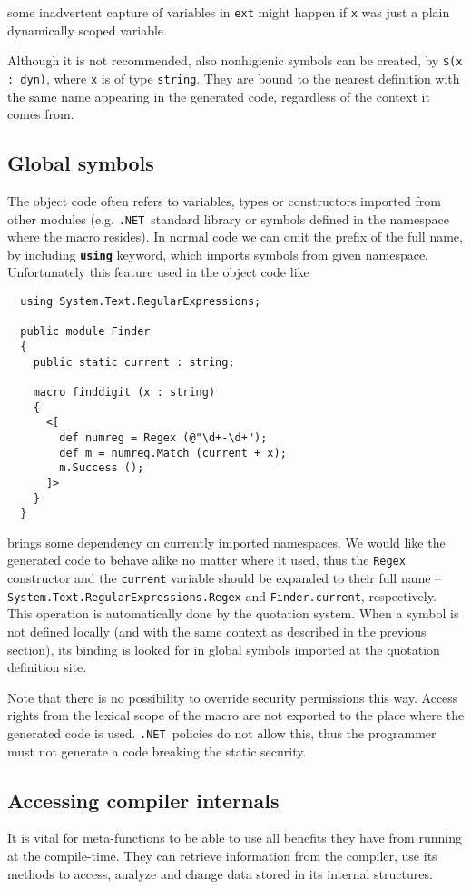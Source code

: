 \documentclass{llncs}
\newcommand{\net}[0]{{\tt .NET}}
\newcommand{\kw}[1]{{\tt \bf #1}}
\begin{document}
\noindent
some inadvertent capture of variables in \verb,ext, might happen if 
\verb,x, was just a plain dynamically scoped variable.

Although it is not recommended, also nonhigienic symbols can be created, by
\verb,$(x : dyn),, where \verb,x, is of type \verb,string,. %
They are bound to the nearest definition with the same name appearing in the
generated code, regardless of the context it comes from.

\subsection{Global symbols}
The object code often refers to variables, types or constructors imported
from other modules (e.g. \net\ standard library or symbols defined in 
the namespace where the macro resides). In normal code we can omit the prefix 
of the full name, by including \kw{using} keyword, which imports symbols from
given namespace. Unfortunately this feature used in the object code like

\begin{verbatim}
  using System.Text.RegularExpressions;

  public module Finder 
  {
    public static current : string;

    macro finddigit (x : string)
    {
      <[ 
        def numreg = Regex (@"\d+-\d+");
        def m = numreg.Match (current + x);
        m.Success ();
      ]>
    }
  }
\end{verbatim} %

\noindent
brings some dependency on currently imported namespaces. We would like the
generated code to behave alike no matter where it used, thus the
\verb,Regex, constructor and the \verb,current, variable should be expanded to
their full name -- \verb,System.Text.RegularExpressions.Regex,
and \verb,Finder.current,, respectively. This operation is automatically
done by the quotation system. When a symbol is not defined locally (and with 
the same context as described in the previous section), its binding is 
looked for in global symbols imported at the quotation definition site.

Note that there is no possibility to override security permissions this
way. Access rights from the lexical scope of the macro are not exported to 
the place where the generated code is used. \net\ policies do not allow this, 
thus the programmer must not generate a code breaking the static security.

\subsection{Accessing compiler internals}
It is vital for meta-functions to be able to use all benefits they have
from running at the compile-time. They can retrieve information from the
compiler, use its methods to access, analyze and change data stored
in its internal structures. 
\end{document}
